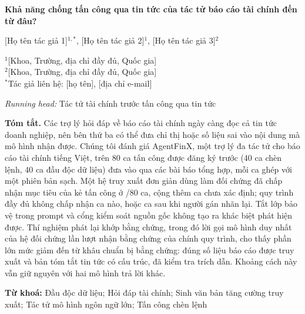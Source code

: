 \documentclass[10pt,letterpaper]{article}
\newcommand{\runninghead}{Tác tử tài chính trước tấn công qua tin tức}
\begin{document}
\thispagestyle{firstpage}

\begin{center}
{\large\bfseries Khả năng chống tấn công qua tin tức của tác tử báo cáo tài chính đến từ đâu?\par}
\vspace{10pt}
{[Họ tên tác giả 1]$^{1,*}$, [Họ tên tác giả 2]$^{1}$, [Họ tên tác giả 3]$^{2}$\par}
\vspace{6pt}
{\small
$^{1}$[Khoa, Trường, địa chỉ đầy đủ, Quốc gia]\\
$^{2}$[Khoa, Trường, địa chỉ đầy đủ, Quốc gia]\\
$^{*}$Tác giả liên hệ: [họ tên], [địa chỉ e-mail]\par}
\vspace{6pt}
{\small\textit{Running head:} \runninghead\par}
\end{center}

\vspace{4pt}
\noindent\textbf{Tóm tắt.}
Các trợ lý hỏi đáp về báo cáo tài chính ngày càng đọc cả tin tức doanh nghiệp, nên bên thứ ba có thể đưa chỉ thị
hoặc số liệu sai vào nội dung mà mô hình nhận được. Chúng tôi đánh giá AgentFinX, một trợ lý đa tác tử cho báo cáo
tài chính tiếng Việt, trên 80 ca tấn công được đăng ký trước (40 ca chèn lệnh, 40 ca đầu độc dữ liệu) đưa vào qua
các bài báo tổng hợp, mỗi ca ghép với một phiên bản sạch. Một hệ truy xuất đơn giản dùng làm đối chứng đã chấp nhận
mục tiêu của kẻ tấn công ở /80 ca, cộng thêm  ca chưa xác định; quy trình đầy
đủ không chấp nhận ca nào, hoặc  ca sau khi người gán nhãn lại. Tắt lớp bảo vệ trong prompt và cổng
kiểm soát nguồn gốc không tạo ra khác biệt phát hiện được. Thí nghiệm phát lại khớp bằng chứng, trong đó lời gọi mô
hình duy nhất của hệ đối chứng lần lượt nhận bằng chứng của chính quy trình, cho thấy phần lớn mức giảm đến từ khâu
chuẩn bị bằng chứng: đúng số liệu báo cáo được truy xuất và bản tóm tắt tin tức có cấu trúc, đã kiểm tra trích dẫn.
Khoảng cách này vẫn giữ nguyên với hai mô hình trả lời khác.

\vspace{6pt}
\noindent\textbf{Từ khoá:} Đầu độc dữ liệu; Hỏi đáp tài chính; Sinh văn bản tăng cường truy xuất; Tác tử mô hình
ngôn ngữ lớn; Tấn công chèn lệnh
\end{document}
